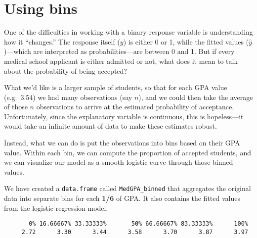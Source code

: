 \documentclass[]{book}
\newenvironment{Shaded}{\begin{snugshade}}{\end{snugshade}}
\newcommand{\KeywordTok}[1]{\textcolor[rgb]{0.13,0.29,0.53}{\textbf{#1}}}
\newcommand{\DataTypeTok}[1]{\textcolor[rgb]{0.13,0.29,0.53}{#1}}
\newcommand{\DecValTok}[1]{\textcolor[rgb]{0.00,0.00,0.81}{#1}}
\newcommand{\StringTok}[1]{\textcolor[rgb]{0.31,0.60,0.02}{#1}}
\newcommand{\OtherTok}[1]{\textcolor[rgb]{0.56,0.35,0.01}{#1}}
\newcommand{\OperatorTok}[1]{\textcolor[rgb]{0.81,0.36,0.00}{\textbf{#1}}}
\newcommand{\NormalTok}[1]{#1}
\begin{document}
\section{Using bins}\label{using-bins}

One of the difficulties in working with a binary response variable is
understanding how it ``changes.'' The response itself (\(y\)) is either
0 or 1, while the fitted values (\(\hat{y}\))---which are interpreted as
probabilities---are between 0 and 1. But if every medical school
applicant is either admitted or not, what does it mean to talk about the
probability of being accepted?

What we'd like is a larger sample of students, so that for each GPA
value (e.g.~3.54) we had many observations (say \(n\)), and we could
then take the average of those \(n\) observations to arrive at the
estimated probability of acceptance. Unfortunately, since the
explanatory variable is continuous, this is hopeless---it would take an
infinite amount of data to make these estimates robust.

Instead, what we can do is put the observations into bins based on their
GPA value. Within each bin, we can compute the proportion of accepted
students, and we can visualize our model as a smooth logistic curve
through those binned values.

We have created a \texttt{data.frame} called \texttt{MedGPA\_binned}
that aggregates the original data into separate bins for each
\textbf{1/6} of GPA. It also contains the fitted values from the
logistic regression model.

\begin{Shaded}
\end{Shaded}

\begin{verbatim}
       0% 16.66667% 33.33333%       50% 66.66667% 83.33333%      100% 
     2.72      3.30      3.44      3.58      3.70      3.87      3.97 
\end{verbatim}

\begin{Shaded}
\end{Shaded}
\end{document}
